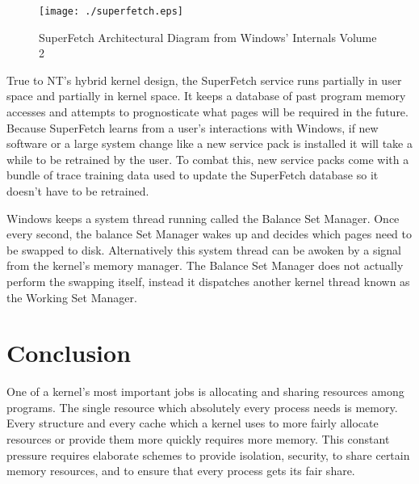 \documentclass[10pt,conference,draftclsnofoot,onecolumn]{IEEEtran}
\begin{document}
\begin{figure}[!ht]
\centering
\texttt{[image: ./superfetch.eps]}
\caption{SuperFetch Architectural Diagram from Windows' Internals Volume 2}
\end{figure}

True to NT's hybrid kernel design, the SuperFetch service runs partially in user space and partially in kernel space. It keeps a database of past program memory accesses and attempts to prognosticate what pages will be required in the future. Because SuperFetch learns from a user's interactions with Windows, if new software or a large system change like a new service pack is installed it will take a while to be retrained by the user. To combat this, new service packs come with a bundle of trace training data used to update the SuperFetch database so it doesn't have to be retrained.

Windows keeps a system thread running called the Balance Set Manager. Once every second, the balance Set Manager wakes up and decides which pages need to be swapped to disk. Alternatively this system thread can be awoken by a signal from the kernel's memory manager. The Balance Set Manager does not actually perform the swapping itself, instead it dispatches another kernel thread known as the Working Set Manager.

\section{Conclusion}
One of a kernel's most important jobs is allocating and sharing resources among programs. The single resource which absolutely every process needs is memory. Every structure and every cache which a kernel uses to more fairly allocate resources or provide them more quickly requires more memory. This constant pressure requires elaborate schemes to provide isolation, security, to share certain memory resources, and to ensure that every process gets its fair share.

\clearpage
\printbibliography

\clearpage

\begin{appendices}


\end{appendices}
\end{document}

